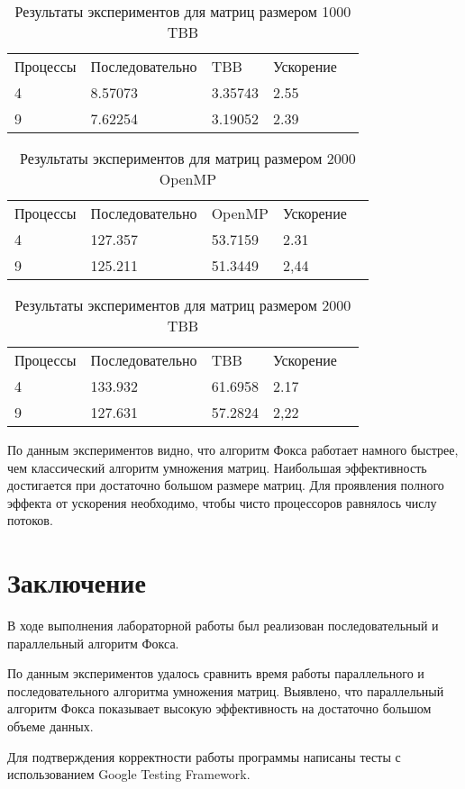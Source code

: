 \documentclass{report}
\begin{document}
\begin{table}[!h]
\caption{Результаты экспериментов для матриц размером 1000 TBB}
\centering
\begin{tabular}{lllll}
Процессы & Последовательно & TBB      & Ускорение  \\
4        & 8.57073         & 3.35743  & 2.55       \\
9        & 7.62254         & 3.19052  & 2.39       \\
\end{tabular}
\end{table}

\begin{table}[!h]
\caption{Результаты экспериментов для матриц размером 2000 OpenMP}
\centering
\begin{tabular}{lllll}
Процессы & Последовательно & OpenMP   & Ускорение  \\
4        & 127.357         & 53.7159  & 2.31       \\
9        & 125.211         & 51.3449  & 2,44
\end{tabular}
\end{table}

\begin{table}[!h]
\caption{Результаты экспериментов для матриц размером 2000 TBB}
\centering
\begin{tabular}{lllll}
Процессы & Последовательно & TBB       & Ускорение     \\
4        & 133.932         & 61.6958   & 2.17          \\
9        & 127.631         & 57.2824   & 2,22
\end{tabular}
\end{table}

\par По данным экспериментов видно, что алгоритм Фокса работает намного быстрее, чем классический алгоритм умножения матриц. Наибольшая эффективность достигается при достаточно большом размере матриц. Для проявления полного эффекта от ускорения необходимо, чтобы чисто процессоров равнялось числу потоков.
\newpage

\section*{Заключение}
В ходе выполнения лабораторной работы был реализован последовательный и параллельный алгоритм Фокса.
\par По данным экспериментов удалось сравнить время работы параллельного и последовательного алгоритма умножения матриц. Выявлено, что параллельный алгоритм Фокса показывает высокую эффективность на достаточно большом объеме данных.
\par Для подтверждения корректности работы программы написаны тесты с использованием Google Testing Framework.
\newpage
\end{document}
